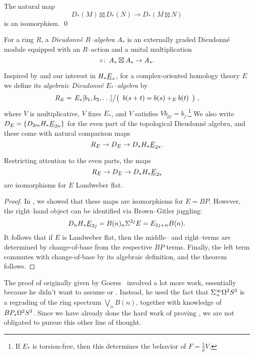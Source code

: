 \begin{lemma}
The natural map \[D_*(M) \boxtimes D_*(N) \to D_*(M \boxtimes N)\] is an isomorphism. \qed
\end{lemma}

\begin{definition}
For a ring $R$, a \emph{Dieudonn\'e $R$--algebra} $A_*$ is an externally graded Dieudonn\'e module equipped with an $R$--action and a unital multiplication \[\circ\colon\thinspace A_* \boxtimes A_* \to A_*.\]
\end{definition}

\begin{example}
Inspired by  and our interest in $H_* \underline{\smash{E}}_{*}$, for a complex-oriented homology theory $E$ we define its \textit{algebraic Dieudonn\'e $E_*$--algebra} by \[R_E = \left. E_*[b_1, b_2, \ldots] \middle/ \left( \begin{array}{c} b(s+t) = b(s) +_E b(t) \end{array} \right) \right.,\] where $V$ is multiplicative, $V$ fixes $E_*$, and $V$ satisfies $Vb_{pj} = b_j$.\footnote{If $E_*$ is torsion-free, then this determines the behavior of $F = \frac{1}{p}V$.}  We also write $D_E = \{D_{2m} H_* \underline{\smash{E}}_{2n}\}$ for the even part of the topological Dieudonn\'e algebra, and these come with natural comparison maps \[R_E \to D_E \to D_* H_* \underline{\smash{E}}_{2*}.\]
\end{example}

\begin{theorem}\label{LandweberFlatUnstableCoopns}
Restricting attention to the even parts, the maps \[R_E \to D_E \to D_* H_* \underline{\smash{E}}_{2*}\] are isomorphisms for $E$ Landweber flat.
\end{theorem}
\begin{proof}
In , we showed that these maps are isomorphisms for $E = BP$.  However, the right--hand object can be identified via Brown--Gitler juggling: \[D_n H_* \underline{\smash{E}}_{2j} = B(n)_n \Sigma^{2j} E = E_{2j+n} B(n).\]  It follows that if $E$ is Landweber flat, then the middle-- and right--terms are determined by change-of-base from the respective $BP$ terms.  Finally, the left term commutes with change-of-base by its algebraic definition, and the theorem follows.
\end{proof}

\begin{remark}
The proof of  originally given by Goerss~\cite{GoerssDieudonne} involved a lot more work, essentially because he didn't want to assume  or .  Instead, he used the fact that $\Sigma^\infty_+ \Omega^2 S^3$ is a regrading of the ring spectrum $\bigvee_n B(n)$, together with knowledge of $BP_* \Omega^2 S^3$.  Since we have already done the hard work of proving , we are not obligated to pursue this other line of thought.
\end{remark}

